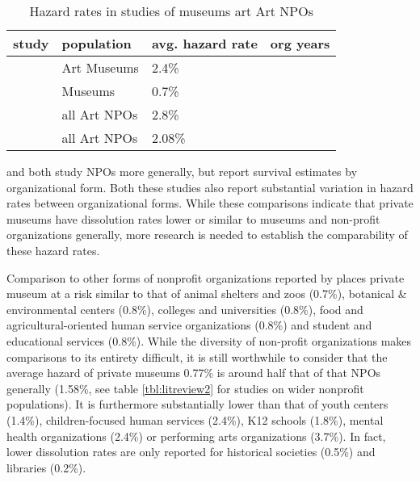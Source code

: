 \documentclass[12pt]{article}
\begin{document}
\begin{table}[htbp]
\caption{\label{tbl:litreview}Hazard rates in studies of museums art Art NPOs}
\centering
\begin{tabular}{llll}
\hline
study & population & avg. hazard rate & org years\\
\hline
\cite{Hager_2001_vulnerability} & Art Museums & 2.4\% & \\
\cite{Gordon_etal_2013_insolvency} & Museums & 0.7\% & \\
\hline
\cite{Hager_2001_vulnerability} & all Art NPOs & 2.8\% & \\
\cite{Gordon_etal_2013_insolvency} & all Art NPOs & 2.08\% & \\
\hline
\end{tabular}
\end{table}

\textcite{Hager_2001_vulnerability} and \textcite{Gordon_etal_2013_insolvency} both study NPOs more generally, but report survival estimates by organizational form.
Both these studies also report substantial variation in hazard rates between organizational forms.
While these comparisons indicate that private museums have dissolution rates lower or similar to museums and non-profit organizations generally, more research is needed to establish the comparability of these hazard rates.


Comparison to other forms of nonprofit organizations reported by \parencite{Gordon_etal_2013_insolvency}
places private museum at a risk similar to that of animal shelters and zoos (0.7\%), botanical \& environmental centers (0.8\%), colleges and universities (0.8\%), food and agricultural-oriented human service organizations (0.8\%) and  student and educational services (0.8\%).
While the diversity of non-profit organizations makes comparisons to its entirety difficult, it is still worthwhile to consider that the average hazard of private museums 0.77\% is around half that of that NPOs generally (1.58\%, see table \ref{tbl:litreview2} for studies on wider nonprofit populations).
It is furthermore substantially lower than that of youth centers (1.4\%), children-focused human services (2.4\%), K12 schools (1.8\%), mental health organizations (2.4\%) or performing arts organizations (3.7\%).
In fact, lower dissolution rates are only reported for historical societies (0.5\%) and libraries (0.2\%).
\end{document}
